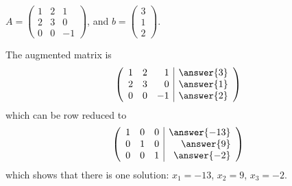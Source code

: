 \documentclass{ximera}
\begin{document}
\begin{exercise} 
$A = \begin{pmatrix}1 & 2 & 1\\ 2 & 3 & 0 \\ 0 & 0 & -1\end{pmatrix}$, 
and $b = \begin{pmatrix}3 \\ 1 \\ 2\end{pmatrix}$.  

\begin{multipleChoice}
\end{multipleChoice}

\begin{problem}
\soln
The augmented matrix is 
\[
\left(\begin{array}{rrr|r} 
  1 & 2 & 1 & \answer{3} \\ 
  2 & 3 & 0 & \answer{1} \\
  0 & 0 & -1 & \answer{2} \end{array} \right)
  \]
which can be row reduced to
\[
\left(\begin{array}{rrr|r} 
  1 & 0 & 0 & \answer{-13} \\ 
  0 & 1 & 0 & \answer{9} \\
  0 & 0 & 1 & \answer{-2} \end{array} \right)
  \]
which shows that there is one solution: $x_1=-13$, $x_2=9$, $x_3=-2$. 

\end{problem}

\end{exercise}
\end{document}
